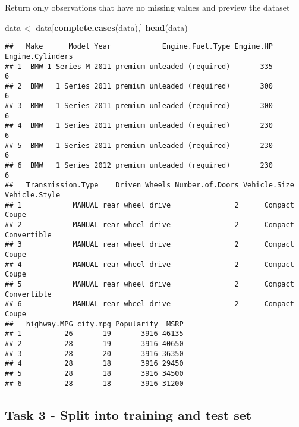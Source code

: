 \documentclass[
]{article}
\newenvironment{Shaded}{\begin{snugshade}}{\end{snugshade}}
\newcommand{\KeywordTok}[1]{\textcolor[rgb]{0.13,0.29,0.53}{\textbf{#1}}}
\newcommand{\NormalTok}[1]{#1}
\newcommand{\OperatorTok}[1]{\textcolor[rgb]{0.81,0.36,0.00}{\textbf{#1}}}
\newcommand{\OtherTok}[1]{\textcolor[rgb]{0.56,0.35,0.01}{#1}}
\newcommand{\StringTok}[1]{\textcolor[rgb]{0.31,0.60,0.02}{#1}}
\begin{document}
\begin{Shaded}
\end{Shaded}

Return only observations that have no missing values and preview the
dataset

\begin{Shaded}
\begin{Highlighting}[]
\NormalTok{data <-}\StringTok{ }\NormalTok{data[}\KeywordTok{complete.cases}\NormalTok{(data),]}
\KeywordTok{head}\NormalTok{(data)}
\end{Highlighting}
\end{Shaded}

\begin{verbatim}
##   Make      Model Year            Engine.Fuel.Type Engine.HP Engine.Cylinders
## 1  BMW 1 Series M 2011 premium unleaded (required)       335                6
## 2  BMW   1 Series 2011 premium unleaded (required)       300                6
## 3  BMW   1 Series 2011 premium unleaded (required)       300                6
## 4  BMW   1 Series 2011 premium unleaded (required)       230                6
## 5  BMW   1 Series 2011 premium unleaded (required)       230                6
## 6  BMW   1 Series 2012 premium unleaded (required)       230                6
##   Transmission.Type    Driven_Wheels Number.of.Doors Vehicle.Size Vehicle.Style
## 1            MANUAL rear wheel drive               2      Compact         Coupe
## 2            MANUAL rear wheel drive               2      Compact   Convertible
## 3            MANUAL rear wheel drive               2      Compact         Coupe
## 4            MANUAL rear wheel drive               2      Compact         Coupe
## 5            MANUAL rear wheel drive               2      Compact   Convertible
## 6            MANUAL rear wheel drive               2      Compact         Coupe
##   highway.MPG city.mpg Popularity  MSRP
## 1          26       19       3916 46135
## 2          28       19       3916 40650
## 3          28       20       3916 36350
## 4          28       18       3916 29450
## 5          28       18       3916 34500
## 6          28       18       3916 31200
\end{verbatim}

\hypertarget{task-3---split-into-training-and-test-set}{%
\subsection{Task 3 - Split into training and test
set}\label{task-3---split-into-training-and-test-set}}
\end{document}

